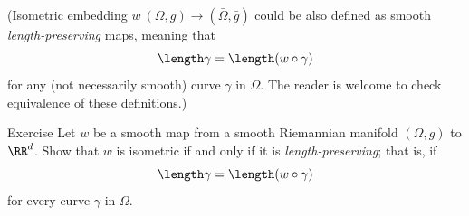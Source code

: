 

















(Isometric embedding $w\:(\Omega, g)\to (\bar\Omega, \bar g)$ could be also defined as smooth \emph{length-preserving} maps, meaning that
\[\length \gamma = \length(w \circ \gamma)\]
for any (not necessarily smooth) curve $\gamma$ in $\Omega$.
The reader is welcome to check equivalence of these definitions.)











\begin{thm}{Exercise}\label{ex:length-preserving}
Let $w$ be a smooth map from a smooth Riemannian manifold $(\Omega, g)$ to $\RR^d$.
Show that $w$ is isometric if and only if it is \emph{length-preserving};
that is, if
\[\length \gamma = \length(w \circ \gamma)\]
for every curve $\gamma$ in $\Omega$.
\end{thm}


